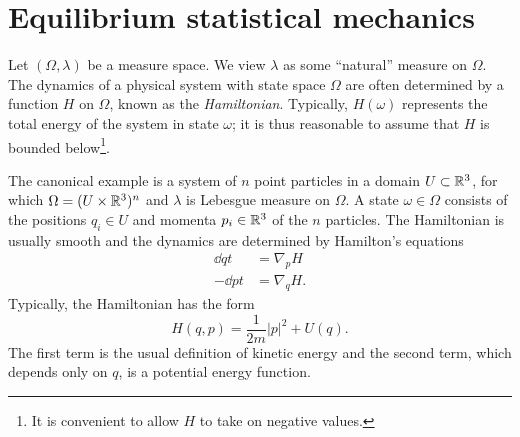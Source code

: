 % 
% 


\section{Equilibrium statistical mechanics}
\label{sec:gibbs}

Let $(\Omega, \lambda)$ be a measure space. We view $\lambda$ as some ``natural''
measure on $\Omega$. The dynamics of a physical system with state space $\Omega$
are often determined by a function $H$ on $\Omega$, known as the \emph{Hamiltonian}.
Typically, $H(\omega)$ represents the total energy of the system in state $\omega$;
it is thus reasonable to assume that $H$ is bounded below\footnote{It is convenient
to allow $H$ to take on negative values.}.

\begin{example}
\label{ex:hamilton}
The canonical example is a system of $n$ point particles in a domain $U \subset {\mathbb R}^3$,
for which $\Omega = (U \times {\mathbb R}^3)^n$ and $\lambda$ is Lebesgue measure on $\Omega$.
A state $\omega\in\Omega$ consists of the positions $q_i \in U$ and momenta $p_i \in {\mathbb R}^3$
of the $n$ particles. The Hamiltonian is usually smooth and the dynamics are determined
by Hamilton's equations
\begin{align}
\dd{q}{t} 	&= \nabla_p H \\
-\dd{p}{t} 	&= \nabla_q H.
\end{align}
Typically, the Hamiltonian has the form
\begin{equation}
\label{e:total-energy}
H(q, p) = \frac{1}{2m} |p|^2 + U(q).
\end{equation}
The first term is the usual definition of kinetic energy and the second term, which
depends only on $q$, is a potential energy function.
\end{example}

